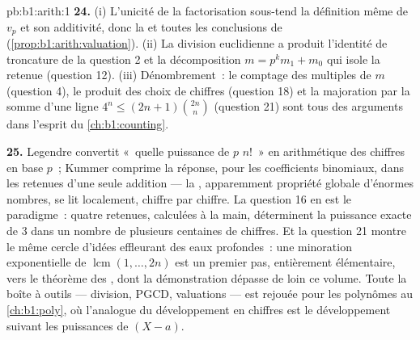 \begin{solution}{pb:b1:arith:1}
\textbf{24.} (i) L'unicité de la factorisation sous-tend la définition
même de $v_p$ et son additivité, donc la 
et toutes les conclusions de 
(\cref{prop:b1:arith:valuation}). (ii) La division euclidienne a produit
l'identité de troncature de la question 2 et la décomposition $m = p^km_1 +
m_0$ qui isole la retenue (question 12). (iii) Dénombrement~: le
comptage des multiples de $m$ (question 4), le produit des choix de chiffres
(question 18) et la majoration par la somme d'une ligne $4^n \leq
(2n+1)\binom{2n}n$ (question 21) sont tous des arguments dans l'esprit du
\cref{ch:b1:counting}.

\textbf{25.} Legendre convertit «~quelle puissance de $p$ 
$n!$~» en arithmétique des chiffres en base $p$~; Kummer comprime la
réponse, pour les coefficients binomiaux, dans les retenues d'une seule
addition --- la , apparemment propriété globale d'énormes
nombres, se lit localement, chiffre par chiffre. La question 16 en est
le paradigme~: quatre retenues, calculées à la main, déterminent la puissance
exacte de $3$ dans un nombre de plusieurs centaines de chiffres. Et la question 21
montre le même cercle d'idées effleurant des eaux profondes~: une
minoration exponentielle de $\operatorname{lcm}(1, \dots, 2n)$ est
un premier pas, entièrement élémentaire, vers le théorème des ,
dont la démonstration dépasse de loin ce volume. Toute la boîte à outils ---
division, PGCD, valuations --- est rejouée pour les polynômes au
\cref{ch:b1:poly}, où l'analogue du développement en chiffres est le
développement suivant les puissances de $(X - a)$.
\end{solution}
